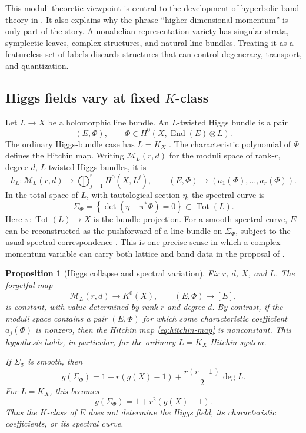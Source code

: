 \documentclass[11pt]{article}
\newtheorem{proposition}[theorem]{Proposition}
\theoremstyle{definition}
\theoremstyle{remark}
\newcommand{\End}{\operatorname{End}}
\newcommand{\cM}{\mathcal M}
\begin{document}
This moduli-theoretic viewpoint is central to the development of hyperbolic
band theory in
\cite{MaciejkoRayan2022,KienzleRayan2022,RayanQuantumMatter2026}.
It also explains why the phrase ``higher-dimensional momentum'' is only part
of the story.  A nonabelian representation variety has singular strata,
symplectic leaves, complex structures, and natural line bundles.  Treating it
as a featureless set of labels discards structures that can control
degeneracy, transport, and quantization.

\subsection{Higgs fields vary at fixed \texorpdfstring{\(K\)}{K}-class}

Let \(L\to X\) be a holomorphic line bundle.  An \(L\)-twisted Higgs bundle is
a pair
\[
                   (E,\Phi),\qquad
       \Phi\in H^0\!\left(X,\End(E)\otimes L\right).
       \tag{6.2}\label{eq:twisted-higgs}
\]
The ordinary Higgs-bundle case has \(L=K_X\)
\cite{HitchinSelfDuality,SimpsonHiggsLocal}.  The characteristic polynomial
of \(\Phi\) defines the Hitchin map.  Writing \(\cM_L(r,d)\) for the moduli
space of rank-\(r\), degree-\(d\), \(L\)-twisted Higgs bundles, it is
\[
  h_L:\cM_L(r,d)\longrightarrow
       \bigoplus_{j=1}^r H^0(X,L^j),
  \qquad
  (E,\Phi)\longmapsto(a_1(\Phi),\ldots,a_r(\Phi)).
  \tag{6.3}\label{eq:hitchin-map}
\]
In the total space of \(L\), with tautological section \(\eta\), the spectral
curve is
\[
          \Sigma_\Phi
          =\left\{\det(\eta-\pi^*\Phi)=0\right\}
          \subset\operatorname{Tot}(L).
          \tag{6.4}\label{eq:spectral-curve}
\]
Here \(\pi:\operatorname{Tot}(L)\to X\) is the bundle projection.
For a smooth spectral curve, \(E\) can be reconstructed as the pushforward of
a line bundle on \(\Sigma_\Phi\), subject to the usual spectral
correspondence \cite{HitchinSelfDuality,BNR}.  This is one precise sense in
which a complex momentum variable can carry both lattice and band data in the
proposal of \cite{KienzleRayan2022}.

\begin{proposition}[Higgs collapse and spectral variation]
\label{prop:higgs-collapse}
Fix \(r\), \(d\), \(X\), and \(L\).  The forgetful map
\[
       \cM_L(r,d)\longrightarrow K^0(X),
       \qquad (E,\Phi)\longmapsto[E],
       \tag{6.5}\label{eq:higgs-to-k}
\]
is constant, with value determined by rank \(r\) and degree \(d\).  By
contrast, if the moduli space contains a pair \((E,\Phi)\) for which some
characteristic coefficient \(a_j(\Phi)\) is nonzero, then the Hitchin map
\eqref{eq:hitchin-map} is nonconstant.  This hypothesis holds, in particular,
for the ordinary \(L=K_X\) Hitchin system.

If \(\Sigma_\Phi\) is smooth, then
\[
 g(\Sigma_\Phi)
    =1+r(g(X)-1)+\frac{r(r-1)}2\deg L.
    \tag{6.6}\label{eq:spectral-genus}
\]
For \(L=K_X\), this becomes
\[
                    g(\Sigma_\Phi)=1+r^2(g(X)-1).
                    \tag{6.7}\label{eq:hitchin-genus}
\]
Thus the \(K\)-class of \(E\) does not determine the Higgs field, its
characteristic coefficients, or its spectral curve.
\end{proposition}
\end{document}
